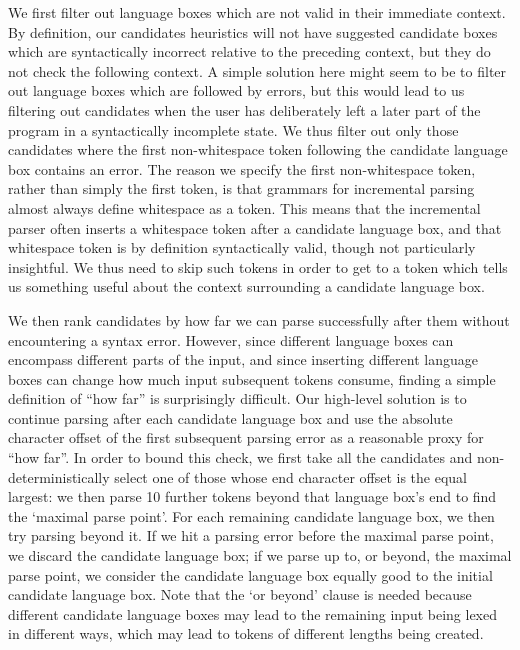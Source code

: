 \documentclass[sigplan,screen]{acmart}
\begin{document}
We first filter out language boxes which are not valid in their immediate
context. By definition, our candidates heuristics will not have suggested
candidate boxes which are syntactically incorrect relative to the preceding
context, but they do not check the following context. A simple solution here
might seem to be to filter out language boxes which are followed by errors, but
this would lead to us filtering out candidates when the user has
deliberately left a later part of the program in a syntactically incomplete
state. We thus filter out only those candidates where the first non-whitespace
token following the candidate language box contains an error. The reason we
specify the first non-whitespace token, rather than simply the first token, is
that grammars for incremental parsing almost always define whitespace as a
token. This means that the incremental parser often inserts a whitespace token
after a candidate language box, and that whitespace token is by definition
syntactically valid, though not particularly insightful. We thus need to skip
such tokens in order to get to a token which tells us something useful about
the context surrounding a candidate language box.

We then rank candidates by how far we can parse successfully after them without encountering
a syntax error. However, since different language boxes can encompass different
parts of the input, and since inserting different language boxes can change how
much input subsequent tokens consume, finding a simple definition of ``how
far'' is surprisingly difficult. Our high-level solution is to continue
parsing after each candidate language box and use the absolute character
offset of the first subsequent parsing error as
a reasonable proxy for ``how far''. In order to bound this check, we first take
all the candidates and non-deterministically select one of those whose end character offset is the
equal largest: we then parse 10 further tokens beyond that language box's end
to find the `maximal parse point'. For each remaining candidate language
box, we then try parsing beyond it. If we hit a parsing error before the
maximal parse point, we discard the candidate language box; if we parse up to, or beyond,
the maximal parse point, we consider the candidate language box equally
good to the initial candidate language box. Note that the `or beyond' clause is needed
because different candidate language boxes may lead to the remaining input
being lexed in different ways, which may lead to tokens of different lengths
being created.
\end{document}
